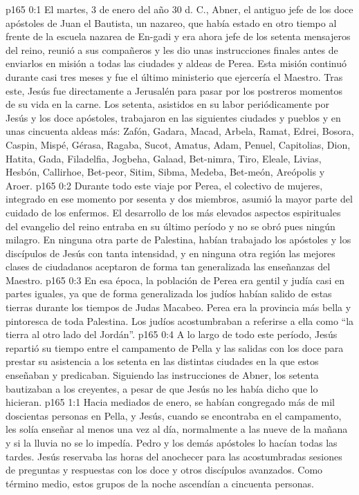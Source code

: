 \author{Comisión de seres intermedios}
\vs p165 0:1 El martes, 3 de enero del año 30 d. C., Abner, el antiguo jefe de los doce apóstoles de Juan el Bautista, un nazareo, que había estado en otro tiempo al frente de la escuela nazarea de En\hyp{}gadi y era ahora jefe de los setenta mensajeros del reino, reunió a sus compañeros y les dio unas instrucciones finales antes de enviarlos en misión a todas las ciudades y aldeas de Perea. Esta misión continuó durante casi tres meses y fue el último ministerio que ejercería el Maestro. Tras este, Jesús fue directamente a Jerusalén para pasar por los postreros momentos de su vida en la carne. Los setenta, asistidos en su labor periódicamente por Jesús y los doce apóstoles, trabajaron en las siguientes ciudades y pueblos y en unas cincuenta aldeas más: Zafón, Gadara, Macad, Arbela, Ramat, Edrei, Bosora, Caspin, Mispé, Gérasa, Ragaba, Sucot, Amatus, Adam, Penuel, Capitolias, Dion, Hatita, Gada, Filadelfia, Jogbeha, Galaad, Bet\hyp{}nimra, Tiro, Eleale, Livias, Hesbón, Callirhoe, Bet\hyp{}peor, Sitim, Sibma, Medeba, Bet\hyp{}meón, Areópolis y Aroer.
\vs p165 0:2 Durante todo este viaje por Perea, el colectivo de mujeres, integrado en ese momento por sesenta y dos miembros, asumió la mayor parte del cuidado de los enfermos. El desarrollo de los más elevados aspectos espirituales del evangelio del reino entraba en su último período y no se obró pues ningún milagro. En ninguna otra parte de Palestina, habían trabajado los apóstoles y los discípulos de Jesús con tanta intensidad, y en ninguna otra región las mejores clases de ciudadanos aceptaron de forma tan generalizada las enseñanzas del Maestro.
\vs p165 0:3 En esa época, la población de Perea era gentil y judía casi en partes iguales, ya que de forma generalizada los judíos habían salido de estas tierras durante los tiempos de Judas Macabeo. Perea era la provincia más bella y pintoresca de toda Palestina. Los judíos acostumbraban a referirse a ella como “la tierra al otro lado del Jordán”.
\vs p165 0:4 A lo largo de todo este período, Jesús repartió su tiempo entre el campamento de Pella y las salidas con los doce para prestar su asistencia a los setenta en las distintas ciudades en la que estos enseñaban y predicaban. Siguiendo las instrucciones de Abner, los setenta bautizaban a los creyentes, a pesar de que Jesús no les había dicho que lo hicieran.
\vs p165 1:1 Hacia mediados de enero, se habían congregado más de mil doscientas personas en Pella, y Jesús, cuando se encontraba en el campamento, les solía enseñar al menos una vez al día, normalmente a las nueve de la mañana y si la lluvia no se lo impedía. Pedro y los demás apóstoles lo hacían todas las tardes. Jesús reservaba las horas del anochecer para las acostumbradas sesiones de preguntas y respuestas con los doce y otros discípulos avanzados. Como término medio, estos grupos de la noche ascendían a cincuenta personas.
